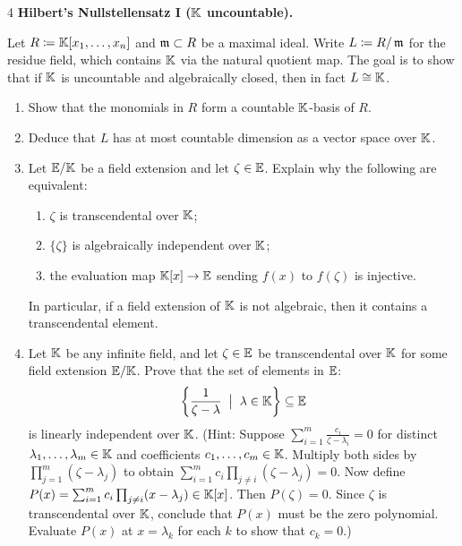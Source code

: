 \documentclass[Notebook.tex]{subfiles}
\begin{document}
\begin{problem}{4}
    \textbf{Hilbert's Nullstellensatz I ($\mathbb K$ uncountable).} 
    
    Let $R \coloneqq \mathbb K[x_1,\ldots,x_n]$ and $\operatorname{\mathfrak{m}} \subset R$ be a maximal ideal. Write $L\coloneqq R/\operatorname{\mathfrak{m}}$ for the residue field, which contains $\mathbb K$ via the natural quotient map. The goal is to show that if $\mathbb K$ is uncountable and algebraically closed, then in fact $L\cong \mathbb K$.
    \begin{enumerate}
        \item Show that the monomials in $R$ form a countable $\mathbb K$-basis of $R$.
        \item Deduce that $L$ has at most countable dimension as a vector space over $\mathbb K$.
        \item Let $\mathbb E/\mathbb K$ be a field extension and let $\zeta \in \mathbb E$. Explain why the following are equivalent:

        \begin{enumerate}[label=(\roman*),ref=\theenumi\roman*]
        \item $\zeta$ is transcendental over $\mathbb K$;
        \item $\{\zeta\}$ is algebraically independent over $\mathbb K$;
        \item the evaluation map $\mathbb K[x]\to \mathbb E$ sending $f(x)$ to $f(\zeta)$ is injective.
        \end{enumerate}
        In particular, if a field extension of $\mathbb K$ is not algebraic, then it contains a transcendental element.
        \item\label{ex-part:family} Let $\mathbb K$ be any infinite field, and let $\zeta \in \mathbb E$ be transcendental over $\mathbb K$ for some field extension $\mathbb E/\mathbb K$. Prove that the set of elements in $\mathbb E$:
        \[
        \left\{\frac{1}{\zeta-\lambda} \;\; \big| \;\; \lambda \in \mathbb K \right\} \subseteq \mathbb E
        \]
        is linearly independent over $\mathbb K$. (Hint: Suppose $\sum_{i=1}^m \frac{c_i}{\zeta-\lambda_i}=0$ for distinct $\lambda_1,\dots,\lambda_m\in \mathbb K$ and coefficients $c_1,\dots,c_m\in \mathbb K$. Multiply both sides by $\prod_{j=1}^m (\zeta-\lambda_j)$ to obtain $\sum_{i=1}^m c_i \prod_{j\neq i} (\zeta-\lambda_j)=0$. Now define $P(x)=\sum_{i=1}^m c_i \prod_{j\neq i} (x-\lambda_j)\in \mathbb K[x]$. Then $P(\zeta)=0$. Since $\zeta$ is transcendental over $\mathbb K$, conclude that $P(x)$ must be the zero polynomial. Evaluate $P(x)$ at $x=\lambda_k$ for each $k$ to show that $c_k=0$.)


\end{enumerate}
\end{problem}
\end{document}
